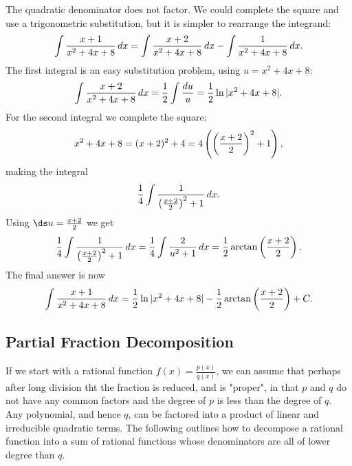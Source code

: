 \begin{solution}
The quadratic denominator
does not factor. We could complete the square and use a trigonometric
substitution, but it is simpler to rearrange the integrand:
$$
  \int {x+1\over x^2+4x+8}\,dx = \int {x+2\over x^2+4x+8}\,dx -
  \int {1\over x^2+4x+8}\,dx.
$$
The first integral is an easy substitution problem, using $u=x^2+4x+8$:
$$
  \int {x+2\over x^2+4x+8}\,dx={1\over2}\int {du\over u}=
  {1\over2}\ln|x^2+4x+8|.
$$
For the second integral we complete the square:
$$
  x^2+4x+8=(x+2)^2+4=4\left(\left({x+2\over2}\right)^2+1\right),
$$
making the integral
$$ 
  {1\over4}\int {1\over\left({x+2\over2}\right)^2+1}\,dx.
$$
Using $\ds u={x+2\over2}$ we get
$$
  {1\over4}\int {1\over\left({x+2\over2}\right)^2+1}\,dx=
  {1\over4}\int {2\over u^2+1}\,dx=
  {1\over2}\arctan\left({x+2\over2}\right).
$$
The final answer is now 
$$
  \int {x+1\over x^2+4x+8}\,dx={1\over2}\ln|x^2+4x+8|-
  {1\over2}\arctan\left({x+2\over2}\right)+C.
$$
\end{solution}


\subsection{Partial Fraction Decomposition}\label{sec:partial_fraction}

If we start with a rational function $f(x)=\frac{p(x)}{q(x)}$, we can assume that perhaps after long division tht the fraction is reduced, and is "proper", in that $p$ and $q$ do not have any common factors and the degree of $p$ is less than the degree of $q$. Any polynomial, and hence $q$, can be factored into a product of linear and irreducible quadratic terms. The following outlines how to decompose a rational function into a sum of rational functions whose denominators are all of lower degree than $q$.


